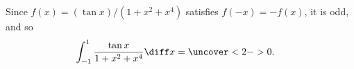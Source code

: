 \begin{frame}
\begin{example}[Example 10, p. 381]
Since $f(x) = (\tan x)/ (1 + x^2 + x^4) $ satisfies $f(-x) = -f(x)$, it is odd, and so
\abovedisplayskip=0pt
\belowdisplayskip=0pt
\begin{align*}
\int_{-1}^1 \frac{\tan x}{1+x^2+x^4} \diff x%
& = %
\uncover<2->{%
0.%
}%
\end{align*}
\end{example}
\end{frame}
